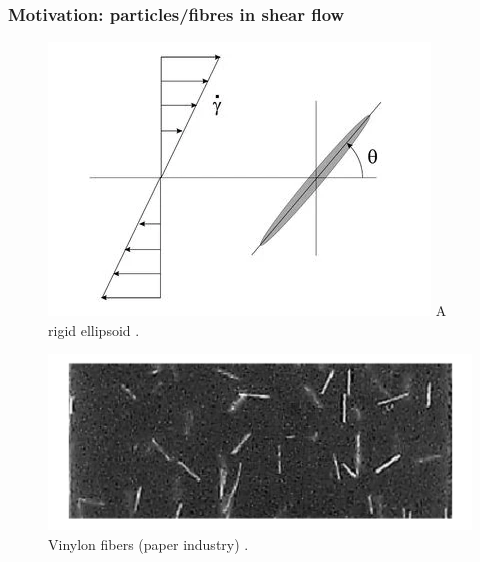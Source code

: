 \documentclass{beamer}
\begin{document}
\begin{frame}
	\frametitle{Motivation: particles/fibres in shear flow}
	\begin{overlayarea}{\textwidth}{\textheight}
		\vspace{-0.2cm}
    	\begin{figure}
			\begin{minipage}{0.4\linewidth}
				\centering
				\includegraphics[width=\linewidth]{plots/application2.png} 
			 \centering \scriptsize A rigid ellipsoid \cite{yasuda2004experimental}.
			\end{minipage}
		\begin{minipage}{0.5\linewidth}
			\centering
			\includegraphics[width=\linewidth]{plots/application2_2.png} 
			\centering \scriptsize Vinylon fibers (paper industry) \cite{yasuda2004experimental}.
		\end{minipage}\vspace{0.5cm}
	\begin{minipage}{0.3\linewidth}
		\centering

\end{minipage}
\end{figure}
\end{overlayarea}
\end{frame}
\end{document}
